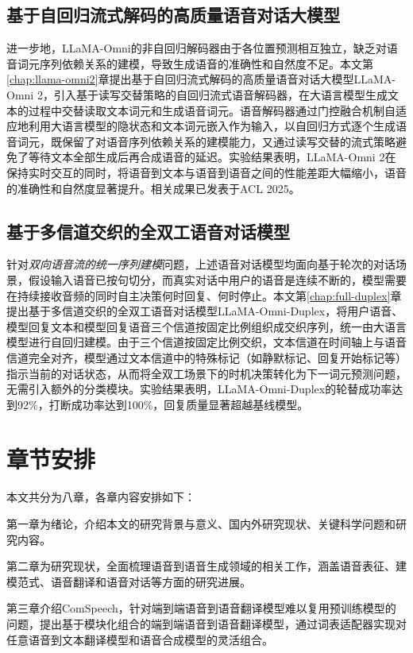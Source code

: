 \subsection{基于自回归流式解码的高质量语音对话大模型}

进一步地，LLaMA-Omni的非自回归解码器由于各位置预测相互独立，缺乏对语音词元序列依赖关系的建模，导致生成语音的准确性和自然度不足。本文第\ref{chap:llama-omni2}章提出基于自回归流式解码的高质量语音对话大模型LLaMA-Omni 2，引入基于读写交替策略的自回归流式语音解码器，在大语言模型生成文本的过程中交替读取文本词元和生成语音词元。语音解码器通过门控融合机制自适应地利用大语言模型的隐状态和文本词元嵌入作为输入，以自回归方式逐个生成语音词元，既保留了对语音序列依赖关系的建模能力，又通过读写交替的流式策略避免了等待文本全部生成后再合成语音的延迟。实验结果表明，LLaMA-Omni 2在保持实时交互的同时，将语音到文本与语音到语音之间的性能差距大幅缩小，语音的准确性和自然度显著提升。相关成果已发表于ACL 2025。

\subsection{基于多信道交织的全双工语音对话模型}

针对\textit{双向语音流的统一序列建模}问题，上述语音对话模型均面向基于轮次的对话场景，假设输入语音已按句切分，而真实对话中用户的语音是连续不断的，模型需要在持续接收音频的同时自主决策何时回复、何时停止。本文第\ref{chap:full-duplex}章提出基于多信道交织的全双工语音对话模型LLaMA-Omni-Duplex，将用户语音、模型回复文本和模型回复语音三个信道按固定比例组织成交织序列，统一由大语言模型进行自回归建模。由于三个信道按固定比例交织，文本信道在时间轴上与语音信道完全对齐，模型通过文本信道中的特殊标记（如静默标记、回复开始标记等）指示当前的对话状态，从而将全双工场景下的时机决策转化为下一词元预测问题，无需引入额外的分类模块。实验结果表明，LLaMA-Omni-Duplex的轮替成功率达到92\%，打断成功率达到100\%，回复质量显著超越基线模型。


\section{章节安排}

本文共分为八章，各章内容安排如下：

第一章为绪论，介绍本文的研究背景与意义、国内外研究现状、关键科学问题和研究内容。

第二章为研究现状，全面梳理语音到语音生成领域的相关工作，涵盖语音表征、建模范式、语音翻译和语音对话等方面的研究进展。

第三章介绍ComSpeech，针对端到端语音到语音翻译模型难以复用预训练模型的问题，提出基于模块化组合的端到端语音到语音翻译模型，通过词表适配器实现对任意语音到文本翻译模型和语音合成模型的灵活组合。

